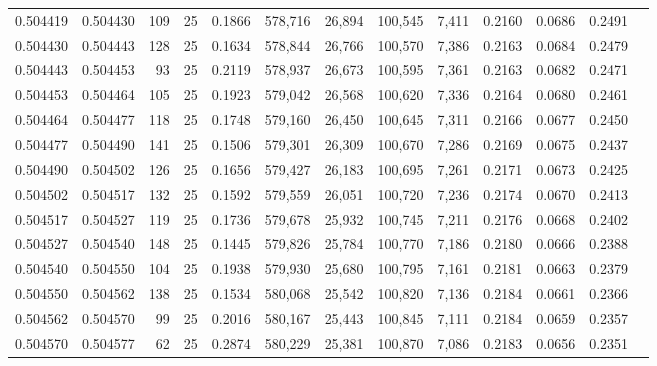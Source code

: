 \begin{tabular}{rrrrrrrrrrrrr}
0.504419 & 0.504430 & 109 &  25 &                                     0.1866 & 578,716 &  26,894 & 100,545 &   7,411 & 0.2160 & 0.0686 & 0.2491 \\
0.504430 & 0.504443 & 128 &  25 &                                     0.1634 & 578,844 &  26,766 & 100,570 &   7,386 & 0.2163 & 0.0684 & 0.2479 \\
0.504443 & 0.504453 &  93 &  25 &                                     0.2119 & 578,937 &  26,673 & 100,595 &   7,361 & 0.2163 & 0.0682 & 0.2471 \\
0.504453 & 0.504464 & 105 &  25 &                                     0.1923 & 579,042 &  26,568 & 100,620 &   7,336 & 0.2164 & 0.0680 & 0.2461 \\
0.504464 & 0.504477 & 118 &  25 &                                     0.1748 & 579,160 &  26,450 & 100,645 &   7,311 & 0.2166 & 0.0677 & 0.2450 \\
0.504477 & 0.504490 & 141 &  25 &                                     0.1506 & 579,301 &  26,309 & 100,670 &   7,286 & 0.2169 & 0.0675 & 0.2437 \\
0.504490 & 0.504502 & 126 &  25 &                                     0.1656 & 579,427 &  26,183 & 100,695 &   7,261 & 0.2171 & 0.0673 & 0.2425 \\
0.504502 & 0.504517 & 132 &  25 &                                     0.1592 & 579,559 &  26,051 & 100,720 &   7,236 & 0.2174 & 0.0670 & 0.2413 \\
0.504517 & 0.504527 & 119 &  25 &                                     0.1736 & 579,678 &  25,932 & 100,745 &   7,211 & 0.2176 & 0.0668 & 0.2402 \\
0.504527 & 0.504540 & 148 &  25 &                                     0.1445 & 579,826 &  25,784 & 100,770 &   7,186 & 0.2180 & 0.0666 & 0.2388 \\
0.504540 & 0.504550 & 104 &  25 &                                     0.1938 & 579,930 &  25,680 & 100,795 &   7,161 & 0.2181 & 0.0663 & 0.2379 \\
0.504550 & 0.504562 & 138 &  25 &                                     0.1534 & 580,068 &  25,542 & 100,820 &   7,136 & 0.2184 & 0.0661 & 0.2366 \\
0.504562 & 0.504570 &  99 &  25 &                                     0.2016 & 580,167 &  25,443 & 100,845 &   7,111 & 0.2184 & 0.0659 & 0.2357 \\
0.504570 & 0.504577 &  62 &  25 &                                     0.2874 & 580,229 &  25,381 & 100,870 &   7,086 & 0.2183 & 0.0656 & 0.2351 \\

\end{tabular}
